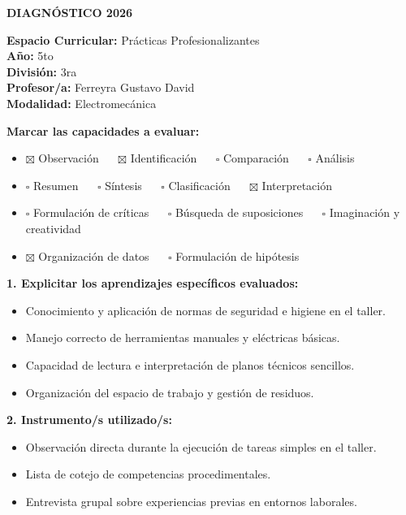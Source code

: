 \documentclass[11pt, a4paper]{article}
\begin{document}
\noindent\colorbox{schoolgreen}{\begin{minipage}{\dimexpr\textwidth-2\fboxsep}\centering \textbf{\fontsize{14}{16}\selectfont DIAGNÓSTICO 2026}\end{minipage}}

\vspace{1.5em}

\begin{flushleft}
\textbf{Espacio Curricular:} Prácticas Profesionalizantes \\
\textbf{Año:} 5to \\
\textbf{División:} 3ra \\
\textbf{Profesor/a:} Ferreyra Gustavo David \\
\textbf{Modalidad:} Electromecánica
\end{flushleft}

\vspace{1em}

\noindent \textbf{Marcar las capacidades a evaluar:}

\begin{itemize}
\item $\boxtimes$ Observación $\quad$ $\boxtimes$ Identificación $\quad$ $\square$ Comparación $\quad$ $\square$ Análisis
\item $\square$ Resumen $\quad$ $\square$ Síntesis $\quad$ $\square$ Clasificación $\quad$ $\boxtimes$ Interpretación
\item $\square$ Formulación de críticas $\quad$ $\square$ Búsqueda de suposiciones $\quad$ $\square$ Imaginación y creatividad
\item $\boxtimes$ Organización de datos $\quad$ $\square$ Formulación de hipótesis
\end{itemize}

\vspace{1em}

\noindent \textbf{1. Explicitar los aprendizajes específicos evaluados:}
\begin{itemize}
\item Conocimiento y aplicación de normas de seguridad e higiene en el taller.
\item Manejo correcto de herramientas manuales y eléctricas básicas.
\item Capacidad de lectura e interpretación de planos técnicos sencillos.
\item Organización del espacio de trabajo y gestión de residuos.
\end{itemize}

\noindent \textbf{2. Instrumento/s utilizado/s:}
\begin{itemize}
\item Observación directa durante la ejecución de tareas simples en el taller.
\item Lista de cotejo de competencias procedimentales.
\item Entrevista grupal sobre experiencias previas en entornos laborales.
\end{itemize}
\end{document}
